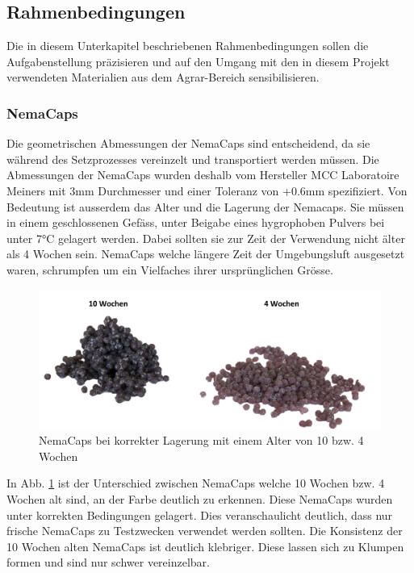\subsection{Rahmenbedingungen}
Die in diesem Unterkapitel beschriebenen Rahmenbedingungen sollen die Aufgabenstellung präzisieren und auf den Umgang mit den in diesem Projekt verwendeten Materialien aus dem Agrar-Bereich sensibilisieren.

\subsubsection{NemaCaps}
Die geometrischen Abmessungen der NemaCaps sind entscheidend, da sie während des Setzprozesses vereinzelt und transportiert werden müssen. Die Abmessungen der NemaCaps wurden deshalb vom Hersteller MCC Laboratoire Meiners mit 3mm Durchmesser und einer Toleranz von +0.6mm spezifiziert. Von Bedeutung ist ausserdem das Alter und die Lagerung der Nemacaps. Sie müssen in einem geschlossenen Gefäss, unter Beigabe eines hygrophoben Pulvers bei unter 7°C gelagert werden. Dabei sollten sie zur Zeit der Verwendung nicht älter als 4 Wochen sein. NemaCaps welche längere Zeit der Umgebungsluft ausgesetzt waren, schrumpfen um ein Vielfaches ihrer ursprünglichen Grösse.

\begin{figure}[H]
	\includegraphics[draft=false,width=1\textwidth]{Illustrationen/4-Entwurf/nemacaps_altvsneu_1.jpg}
	\caption{NemaCaps bei korrekter Lagerung mit einem Alter von 10 bzw. 4 Wochen}
	\label{fig:nemacaps_altvsneu}
\end{figure}

In Abb. \ref{fig:nemacaps_altvsneu} ist der Unterschied zwischen NemaCaps welche 10 Wochen bzw. 4 Wochen alt sind, an der Farbe deutlich zu erkennen. Diese NemaCaps wurden unter korrekten Bedingungen gelagert. Dies veranschaulicht deutlich, dass nur frische NemaCaps zu Testzwecken verwendet werden sollten. Die Konsistenz der 10 Wochen alten NemaCaps ist deutlich klebriger. Diese lassen sich zu Klumpen formen und sind nur schwer vereinzelbar.

